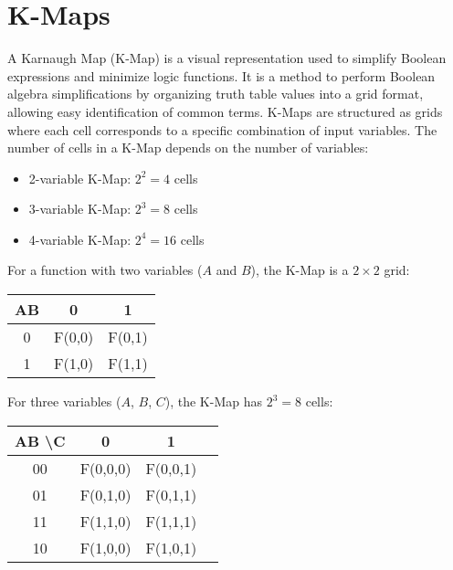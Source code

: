 \section{K-Maps}

A Karnaugh Map (K-Map) is a visual representation used to simplify Boolean expressions and minimize logic functions. It is a method to perform Boolean algebra simplifications by organizing truth table values into a grid format, allowing easy identification of common terms.
K-Maps are structured as grids where each cell corresponds to a specific combination of input variables. The number of cells in a K-Map depends on the number of variables:

\begin{itemize}
    \item 2-variable K-Map: $2^2 = 4$ cells
    \item 3-variable K-Map: $2^3 = 8$ cells
    \item 4-variable K-Map: $2^4 = 16$ cells
\end{itemize}

For a function with two variables ($A$ and $B$), the K-Map is a $2 \times 2$ grid:

\begin{center}
    \begin{tabular}{|c|c|c|}
        \hline
        AB & 0      & 1      \\
        \hline
        0  & F(0,0) & F(0,1) \\
        \hline
        1  & F(1,0) & F(1,1) \\
        \hline
    \end{tabular}
\end{center}

For three variables ($A$, $B$, $C$), the K-Map has $2^3 = 8$ cells:

\begin{center}
    \begin{tabular}{|c|c|c|c|}
        \hline
        AB \textbackslash C & 0        & 1        \\
        \hline
        00                  & F(0,0,0) & F(0,0,1) \\
        \hline
        01                  & F(0,1,0) & F(0,1,1) \\
        \hline
        11                  & F(1,1,0) & F(1,1,1) \\
        \hline
        10                  & F(1,0,0) & F(1,0,1) \\
        \hline
    \end{tabular}
\end{center}

